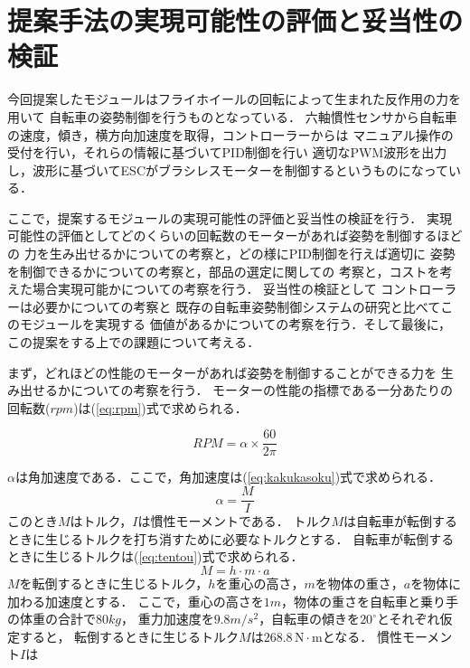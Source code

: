\documentclass[uplatex,dvipdfmx]{jsarticle}
\begin{document}


\section{提案手法の実現可能性の評価と妥当性の検証}
今回提案したモジュールはフライホイールの回転によって生まれた反作用の力を用いて
自転車の姿勢制御を行うものとなっている．
六軸慣性センサから自転車の速度，傾き，横方向加速度を取得，コントローラーからは
マニュアル操作の受付を行い，それらの情報に基づいてPID制御を行い
適切なPWM波形を出力し，波形に基づいてESCがブラシレスモーターを制御するというものになっている．

ここで，提案するモジュールの実現可能性の評価と妥当性の検証を行う．
実現可能性の評価としてどのくらいの回転数のモーターがあれば姿勢を制御するほどの
力を生み出せるかについての考察と，どの様にPID制御を行えば適切に
姿勢を制御できるかについての考察と，部品の選定に関しての
考察と，コストを考えた場合実現可能かについての考察を行う．
妥当性の検証として
コントローラーは必要かについての考察と
既存の自転車姿勢制御システムの研究と比べてこのモジュールを実現する
価値があるかについての考察を行う．そして最後に，この提案をする上での課題について考える．

まず，どれほどの性能のモーターがあれば姿勢を制御することができる力を
生み出せるかについての考察を行う．
モーターの性能の指標である一分あたりの回転数($rpm$)は(\ref{eq:rpm})式で求められる．

\begin{equation}
{RPM} = \alpha \times \frac{60}{2\pi}
\label{eq:rpm}
\end{equation}

$\alpha$は角加速度である．ここで，角加速度は(\ref{eq:kakukasoku})式で求められる．
\begin{equation}
\alpha = \frac{M}{I}
\label{eq:kakukasoku}
\end{equation}
このとき$M$はトルク，$I$は慣性モーメントである．
トルク$M$は自転車が転倒するときに生じるトルクを打ち消すために必要なトルクとする．
自転車が転倒するときに生じるトルクは(\ref{eq:tentou})式で求められる．
\begin{equation}
M = h \cdot m \cdot a
\label{eq:tentou}
\end{equation}
$M$を転倒するときに生じるトルク，$h$を重心の高さ，$m$を物体の重さ，$a$を物体に加わる加速度とする．
ここで，重心の高さを$1m$，物体の重さを自転車と乗り手の体重の合計で$80kg$，
重力加速度を$9.8m/s^2$，自転車の傾きを$20^\circ$とそれぞれ仮定すると，
転倒するときに生じるトルク$M$は$ 268.8 \, \mathrm{N \cdot m} $となる．
慣性モーメント$I$は
\end{document}
